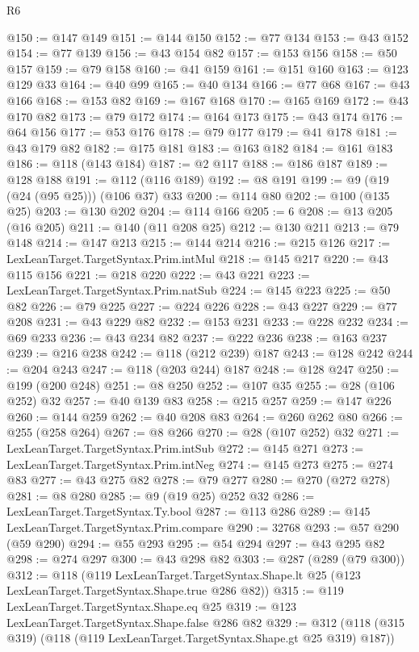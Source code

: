 \begin{lexlean}{R6}
\begin{coremodule}
@150 := @147 @149
@151 := @144 @150
@152 := @77 @134
@153 := @43 @152
@154 := @77 @139
@156 := @43 @154 @82
@157 := @153 @156
@158 := @50 @157
@159 := @79 @158
@160 := @41 @159
@161 := @151 @160
@163 := @123 @129 @33
@164 := @40 @99
@165 := @40 @134
@166 := @77 @68
@167 := @43 @166
@168 := @153 @82
@169 := @167 @168
@170 := @165 @169
@172 := @43 @170 @82
@173 := @79 @172
@174 := @164 @173
@175 := @43 @174
@176 := @64 @156
@177 := @53 @176
@178 := @79 @177
@179 := @41 @178
@181 := @43 @179 @82
@182 := @175 @181
@183 := @163 @182
@184 := @161 @183
@186 := @118 (@143 @184)
@187 := @2 @117
@188 := @186 @187
@189 := @128 @188
@191 := @112 (@116 @189)
@192 := @8 @191
@199 := @9 (@19 (@24 (@95 @25))) (@106 @37) @33
@200 := @114 @80
@202 := @100 (@135 @25)
@203 := @130 @202
@204 := @114 @166
@205 := 6
@208 := @13 @205 (@16 @205)
@211 := @140 (@11 @208 @25)
@212 := @130 @211
@213 := @79 @148
@214 := @147 @213
@215 := @144 @214
@216 := @215 @126
@217 := LexLeanTarget.TargetSyntax.Prim.intMul
@218 := @145 @217
@220 := @43 @115 @156
@221 := @218 @220
@222 := @43 @221
@223 := LexLeanTarget.TargetSyntax.Prim.natSub
@224 := @145 @223
@225 := @50 @82
@226 := @79 @225
@227 := @224 @226
@228 := @43 @227
@229 := @77 @208
@231 := @43 @229 @82
@232 := @153 @231
@233 := @228 @232
@234 := @69 @233
@236 := @43 @234 @82
@237 := @222 @236
@238 := @163 @237
@239 := @216 @238
@242 := @118 (@212 @239) @187
@243 := @128 @242
@244 := @204 @243
@247 := @118 (@203 @244) @187
@248 := @128 @247
@250 := @199 (@200 @248)
@251 := @8 @250
@252 := @107 @35
@255 := @28 (@106 @252) @32
@257 := @40 @139 @83
@258 := @215 @257
@259 := @147 @226
@260 := @144 @259
@262 := @40 @208 @83
@264 := @260 @262 @80
@266 := @255 (@258 @264)
@267 := @8 @266
@270 := @28 (@107 @252) @32
@271 := LexLeanTarget.TargetSyntax.Prim.intSub
@272 := @145 @271
@273 := LexLeanTarget.TargetSyntax.Prim.intNeg
@274 := @145 @273
@275 := @274 @83
@277 := @43 @275 @82
@278 := @79 @277
@280 := @270 (@272 @278)
@281 := @8 @280
@285 := @9 (@19 @25) @252 @32
@286 := LexLeanTarget.TargetSyntax.Ty.bool
@287 := @113 @286
@289 := @145 LexLeanTarget.TargetSyntax.Prim.compare
@290 := 32768
@293 := @57 @290 (@59 @290)
@294 := @55 @293
@295 := @54 @294
@297 := @43 @295 @82
@298 := @274 @297
@300 := @43 @298 @82
@303 := @287 (@289 (@79 @300))
@312 := @118
    (@119
      LexLeanTarget.TargetSyntax.Shape.lt
      @25
      (@123 LexLeanTarget.TargetSyntax.Shape.true @286 @82))
@315 := @119 LexLeanTarget.TargetSyntax.Shape.eq @25
@319 := @123 LexLeanTarget.TargetSyntax.Shape.false @286 @82
@329 := @312 (@118 (@315 @319) (@118 (@119 LexLeanTarget.TargetSyntax.Shape.gt @25 @319) @187))

\end{coremodule}
\end{lexlean}
